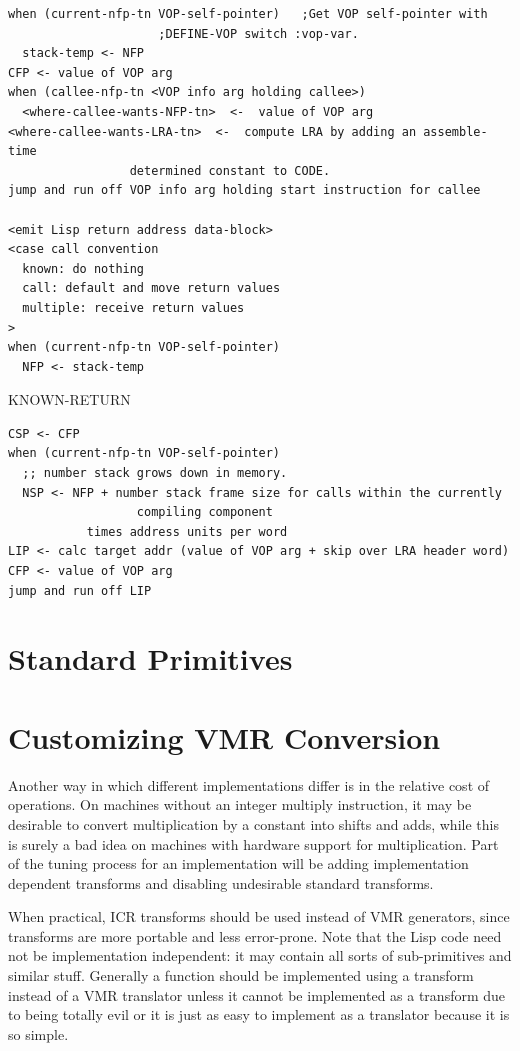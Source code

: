 \begin{verbatim}
when (current-nfp-tn VOP-self-pointer)   ;Get VOP self-pointer with
					 ;DEFINE-VOP switch :vop-var.
  stack-temp <- NFP
CFP <- value of VOP arg
when (callee-nfp-tn <VOP info arg holding callee>)
  <where-callee-wants-NFP-tn>  <-  value of VOP arg
<where-callee-wants-LRA-tn>  <-  compute LRA by adding an assemble-time
				 determined constant to CODE.
jump and run off VOP info arg holding start instruction for callee

<emit Lisp return address data-block>
<case call convention
  known: do nothing
  call: default and move return values
  multiple: receive return values
>
when (current-nfp-tn VOP-self-pointer)   
  NFP <- stack-temp
\end{verbatim}

KNOWN-RETURN
\begin{verbatim}
CSP <- CFP
when (current-nfp-tn VOP-self-pointer)
  ;; number stack grows down in memory.
  NSP <- NFP + number stack frame size for calls within the currently
                  compiling component
	       times address units per word
LIP <- calc target addr (value of VOP arg + skip over LRA header word)
CFP <- value of VOP arg
jump and run off LIP

\end{verbatim}

\chapter{Standard Primitives}

\chapter{Customizing VMR Conversion}

Another way in which different implementations differ is in the relative cost
of operations.  On machines without an integer multiply instruction, it may be
desirable to convert multiplication by a constant into shifts and adds, while
this is surely a bad idea on machines with hardware support for multiplication.
Part of the tuning process for an implementation will be adding implementation
dependent transforms and disabling undesirable standard transforms.

When practical, ICR transforms should be used instead of VMR generators, since
transforms are more portable and less error-prone.  Note that the Lisp code
need not be implementation independent: it may contain all sorts of
sub-primitives and similar stuff.  Generally a function should be implemented
using a transform instead of a VMR translator unless it cannot be implemented
as a transform due to being totally evil or it is just as easy to implement as
a translator because it is so simple.

